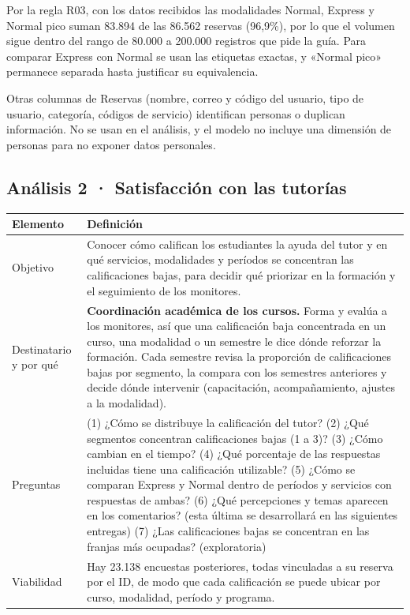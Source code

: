 \documentclass[11pt,letterpaper]{article}
\begin{document}
Por la regla R03, con los datos recibidos las modalidades Normal, Express y Normal pico suman 83.894 de las 86.562 reservas (96,9\%), por lo que el volumen sigue dentro del rango de 80.000 a 200.000 registros que pide la guía. Para comparar Express con Normal se usan las etiquetas exactas, y «Normal pico» permanece separada hasta justificar su equivalencia.

Otras columnas de Reservas (nombre, correo y código del usuario, tipo de usuario, categoría, códigos de servicio) identifican personas o duplican información. No se usan en el análisis, y el modelo no incluye una dimensión de personas para no exponer datos personales.


\subsection{Análisis 2 · Satisfacción con las tutorías}

\begingroup\small\setlength{\tabcolsep}{4pt}\renewcommand{\arraystretch}{1.15}
\begin{longtable}{>{\raggedright\arraybackslash}p{}>{\raggedright\arraybackslash}p{}}
\toprule
\textbf{Elemento} & \textbf{Definición} \\
\midrule
\endhead
Objetivo & Conocer cómo califican los estudiantes la ayuda del tutor y en qué servicios, modalidades y períodos se concentran las calificaciones bajas, para decidir qué priorizar en la formación y el seguimiento de los monitores. \\
Destinatario y por qué & \textbf{Coordinación académica de los cursos.} Forma y evalúa a los monitores, así que una calificación baja concentrada en un curso, una modalidad o un semestre le dice dónde reforzar la formación. Cada semestre revisa la proporción de calificaciones bajas por segmento, la compara con los semestres anteriores y decide dónde intervenir (capacitación, acompañamiento, ajustes a la modalidad). \\
Preguntas & (1) ¿Cómo se distribuye la calificación del tutor? (2) ¿Qué segmentos concentran calificaciones bajas (1 a 3)? (3) ¿Cómo cambian en el tiempo? (4) ¿Qué porcentaje de las respuestas incluidas tiene una calificación utilizable? (5) ¿Cómo se comparan Express y Normal dentro de períodos y servicios con respuestas de ambas? (6) ¿Qué percepciones y temas aparecen en los comentarios? (esta última se desarrollará en las siguientes entregas) (7) ¿Las calificaciones bajas se concentran en las franjas más ocupadas? (exploratoria) \\
Viabilidad & Hay 23.138 encuestas posteriores, todas vinculadas a su reserva por el ID, de modo que cada calificación se puede ubicar por curso, modalidad, período y programa. \\
\bottomrule
\end{longtable}
\endgroup
\end{document}
